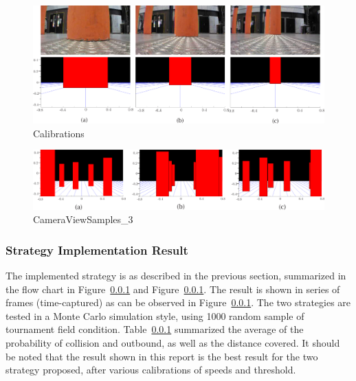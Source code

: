 \begin{figure}
\includegraphics[width=0.9\linewidthm]{Figures/Calibrations}
\centering
\caption{Calibrations}
\label{f:Calibrations}
\end{figure} 

\begin{figure}
\includegraphics[width=0.9\linewidthm]{Figures/CameraViewSamples_3}
\centering
\caption{CameraViewSamples_3}
\label{f:CameraViewSamples}
\end{figure} 

\subsubsection{Strategy Implementation Result}
The implemented strategy is as described in the previous section, summarized in the flow chart in Figure~\ref{} and Figure~\ref{}. The result is shown in series of frames (time-captured) as can be observed in Figure~\ref{}. The two strategies are tested in a Monte Carlo simulation style, using 1000 random sample of tournament field condition. Table~\ref{} summarized the average of the probability of collision and outbound, as well as the distance covered. It should be noted that the result shown in this report is the best result for the two strategy proposed, after various calibrations of speeds and threshold. 


